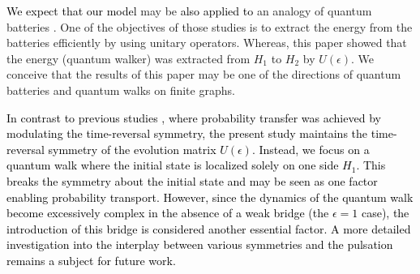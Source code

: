 \documentclass[12pt]{article}
\numberwithin{lemma}{section}
\numberwithin{proposition}{section}
\numberwithin{remark}{section}
\numberwithin{definition}{section}
\newcommand{\red}{\textcolor{black}}
\begin{document}
\red{We expect that our model} may be \red{also applied to} an analogy of quantum batteries \cite{AF}. One of the objectives of those studies is to extract the energy from the batteries efficiently by using unitary operators. Whereas, this paper showed that the energy (quantum walker) was extracted from $H_1$ to $H_2$ by $U(\epsilon)$. We conceive that the results of this paper may be one of the directions of quantum batteries and quantum walks on finite graphs.


\red{
In contrast to previous studies \cite{CWZ,Chiral}, where probability transfer was achieved by modulating the time-reversal symmetry, the present study maintains the time-reversal symmetry of the evolution matrix $U(\epsilon)$. Instead, we focus on a quantum walk where the initial state is localized solely on one side $H_{1}$. This breaks the symmetry about the initial state and may be seen as one factor enabling probability transport. However, since the dynamics of the quantum walk become excessively complex in the absence of a weak bridge (the $\epsilon=1$ case), the introduction of this bridge is considered another essential factor. A more detailed investigation into the interplay between various symmetries and the pulsation remains a subject for future work.
}
\end{document}
